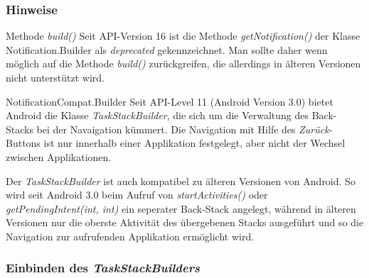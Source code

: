 \begin{frame}
   \frametitle{Hinweise}

   \begin{alertblock}{Methode \emph{build()}}
      Seit API-Version 16 ist die Methode \emph{getNotification()} der Klasse 
      Notification.Builder als \emph{deprecated} gekennzeichnet. Man sollte 
      daher wenn möglich auf die Methode \emph{build()} zurückgreifen, die 
      allerdings in älteren Versionen nicht unterstützt wird.
   \end{alertblock}

   \begin{alertblock}{NotificationCompat.Builder}
      Seit API-Level 11 (Android Version 3.0) bietet Android die Klasse 
      \emph{TaskStackBuilder}, die sich um die Verwaltung des Back-Stacks 
      bei der Navaigation kümmert. Die Navigation mit Hilfe des \emph{Zurück}-Buttons 
      ist nur innerhalb einer Applikation festgelegt, aber nicht der Wechsel zwischen 
      Applikationen.

      \vspace{3mm}

      Der \emph{TaskStackBuilder} ist auch kompatibel 
      zu älteren Versionen von Android. So wird seit Android 3.0 beim Aufruf von 
      \emph{startActivities()} oder \emph{getPendingIntent(int, int)} ein 
      seperater Back-Stack angelegt, während in älteren Versionen nur die oberste 
      Aktivität des übergebenen Stacks ausgeführt und so die Navigation zur aufrufenden 
      Applikation ermöglicht wird.
   \end{alertblock}
\end{frame}

\begin{frame}
   \frametitle{Einbinden des \emph{TaskStackBuilders}}

   
\end{frame}

